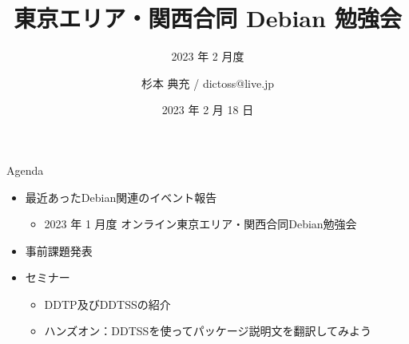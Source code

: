 \title{東京エリア・関西合同 Debian 勉強会}
\subtitle{2023 年 2 月度} %
\author{杉本 典充 / dictoss@live.jp}
\date{2023 年 2 月 18 日}



\begin{frame}
\titlepage{}
\end{frame}

\begin{frame}{Agenda}
 \begin{minipage}[t]{0.45\hsize}
  \begin{itemize}
  \item 最近あったDebian関連のイベント報告
    \begin{itemize}
    \item 2023 年 1 月度 オンライン東京エリア・関西合同Debian勉強会
    \end{itemize}
  \item 事前課題発表
  \end{itemize}
 \end{minipage}
 \begin{minipage}[t]{0.45\hsize}
   \begin{itemize}
   \item セミナー
     \begin{itemize}
     \item DDTP及びDDTSSの紹介
     \item ハンズオン：DDTSSを使ってパッケージ説明文を翻訳してみよう
     \end{itemize}
  \end{itemize}
 \end{minipage}
\end{frame}

